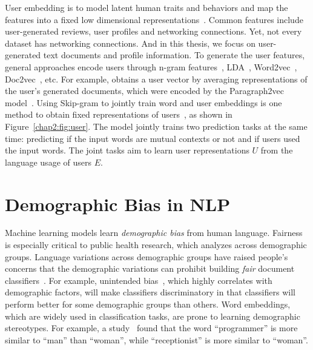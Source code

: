 User embedding is to model latent human traits and behaviors and map the features into a fixed low dimensional representations~\cite{pan2019social}. 
Common features include user-generated reviews, user profiles and networking connections. 
Yet, not every dataset has networking connections. 
And in this thesis, we focus on user-generated text documents and profile information.
To generate the user features, general approaches encode users through n-gram features~\cite{benton2016learning}, LDA~\cite{zhang2015using, ding2017multi}, Word2vec~\cite{amir2016modelling, benton2016learning, amir2017quantifying, wu2018starspace}, Doc2vec~\cite{ding2017multi, ding2018predicting}, etc.
For example, \cite{ding2018predicting} obtains a user vector by averaging representations of the user's generated documents, which were encoded by the Paragraph2vec model~\cite{le2014distributed}.
Using Skip-gram to jointly train word and user embeddings is one method to obtain fixed representations of users~\cite{amir2017quantifying}, as shown in Figure~\ref{chap2:fig:user}.
The model jointly trains two prediction tasks at the same time: predicting if the input words are mutual contexts or not and if users used the input words.
The joint tasks aim to learn user representations $U$ from the language usage of users $E$.


\section{Demographic Bias in NLP}

Machine learning models learn \textit{demographic bias} from human language.
Fairness is especially critical to public health research, which analyzes across demographic groups. 
Language variations across demographic groups have raised people's concerns that the demographic variations can prohibit building \textit{fair} document classifiers~\cite{sun2019mitigating, bender2018data}. 
For example, unintended bias~\cite{dixon2018measuring}, which highly correlates with demographic factors, will make classifiers discriminatory in that classifiers will perform better for some demographic groups than others. 
Word embeddings, which are widely used in classification tasks, are prone to learning demographic stereotypes.
For example, a study~\cite{bolukbasi2016man} found that the word ``programmer'' is more similar to ``man'' than ``woman'', while ``receptionist'' is more similar to ``woman''.


